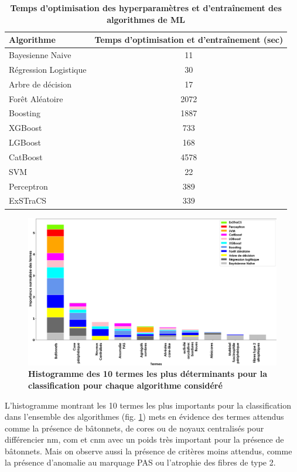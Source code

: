 \begin{table}[!ht]
    \centering
    \begin{tabular}{lc}
        \toprule
        Algorithme & Temps d'optimisation et d'entraînement (sec) \\
        \midrule
        Bayesienne Naive & 11 \\
        Régression Logistique & 30 \\
        Arbre de décision & 17 \\
        Forêt Aléatoire & 2072 \\
        Boosting & 1887 \\
        XGBoost & 733 \\
        LGBoost & 168 \\
        CatBoost & 4578 \\
        SVM & 22 \\
        Perceptron & 389 \\
        ExSTraCS & 339 \\
        \bottomrule
    \end{tabular}
    \caption[Temps d'optimisation des hyperparamètres et d'entraînement des algorithmes de ML]{\textbf{Temps d'optimisation des hyperparamètres et d'entraînement des algorithmes de ML}}
    \label{tab:pipeline_times}
\end{table}
\begin{figure}[!ht]
  \centering
  \includegraphics[width=1\textwidth]{figures/feature_importance.png}
  \caption[Histogramme des 10 termes les plus déterminants pour la classification]{\textbf{Histogramme des 10 termes les plus déterminants pour la classification pour chaque algorithme considéré}}
  \label{fig:feautre_importance}
\end{figure}
L'histogramme montrant les 10 termes les plus importants pour la classification dans l'ensemble des algorithmes (fig. \ref{fig:feautre_importance}) mets en évidence des termes attendus comme la présence de bâtonnets, de cores ou de noyaux centralisés pour différencier \gls{nm}, \gls{com} et \gls{cnm} avec un poids très important pour la présence de bâtonnets. Mais on observe aussi la présence de critères moins attendus, comme la présence d'anomalie au marquage PAS ou l'atrophie des fibres de type 2.
